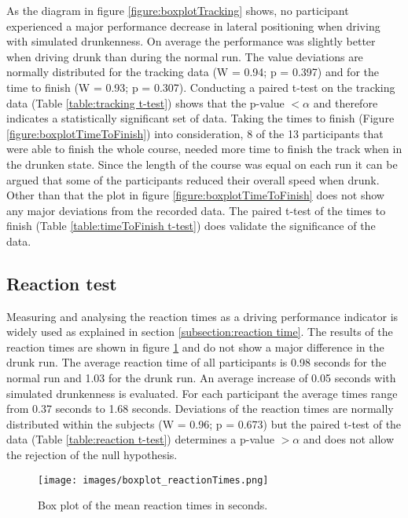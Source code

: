 As the diagram in figure \ref{figure:boxplotTracking} shows, no participant experienced a major performance decrease in lateral positioning when driving with simulated drunkenness. 
On average the performance was slightly better when driving drunk than during the normal run.
The value deviations are normally distributed for the tracking data (W = 0.94; p = 0.397) and for the time to finish (W = 0.93; p = 0.307).
Conducting a paired t-test on the tracking data (Table \ref{table:tracking t-test}) shows that the p-value $<\alpha$ and therefore indicates a statistically significant set of data.
Taking the times to finish (Figure \ref{figure:boxplotTimeToFinish}) into consideration, 8 of the 13 participants that were able to finish the whole course, needed more time to finish the track when in the drunken state.
Since the length of the course was equal on each run it can be argued that some of the participants reduced their overall speed when drunk.
Other than that the plot in figure \ref{figure:boxplotTimeToFinish} does not show any major deviations from the recorded data. 
The paired t-test of the times to finish (Table \ref{table:timeToFinish t-test}) does validate the significance of the data.

\subsection{Reaction test}
\label{subsection:evaluation reaction}

Measuring and analysing the reaction times as a driving performance indicator is widely used as explained in section \ref{subsection:reaction time}.
The results of the reaction times are shown in figure \ref{figure:boxplotReactionTimes} and do not show a major difference in the drunk run.
The average reaction time of all participants is 0.98 seconds for the normal run and 1.03 for the drunk run.
An average increase of 0.05 seconds with simulated drunkenness is evaluated.
For each participant the average times range from 0.37 seconds to 1.68 seconds.
Deviations of the reaction times are normally distributed within the subjects (W = 0.96; p = 0.673) but the paired t-test of the data (Table \ref{table:reaction t-test}) determines a p-value $>\alpha$ and does not allow the rejection of the null hypothesis.


\begin{figure}[h]
    \centering
	\texttt{[image: images/boxplot\_reactionTimes.png]}
	\caption[
		Box plot mean reaction times
	]{
		Box plot of the mean reaction times in seconds.
	}
	\label{figure:boxplotReactionTimes}
\end{figure}

